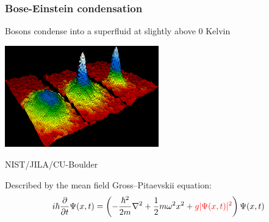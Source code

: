 \documentclass{beamer}
\begin{document}
\begin{frame}
\frametitle{Bose-Einstein condensation}
Bosons condense into a superfluid at slightly above 0 Kelvin

\begin{center}
\includegraphics[width=0.5\textwidth]{Bose_Einstein_condensate.png}

\tiny{NIST/JILA/CU-Boulder}
\end{center}

\pause

Described by the mean field Gross--Pitaevskii equation:
\begin{equation*}
    i\hbar \frac{\partial}{\partial t}\Psi(x,t) = \left( - \frac{\hbar^2}{2m} \nabla^2 + \frac{1}{2}m\omega^2x^2 + {\color{red}{g |\Psi(x,t)|^2}}\right)\Psi(x,t)
\end{equation*}


\end{frame}
\end{document}
